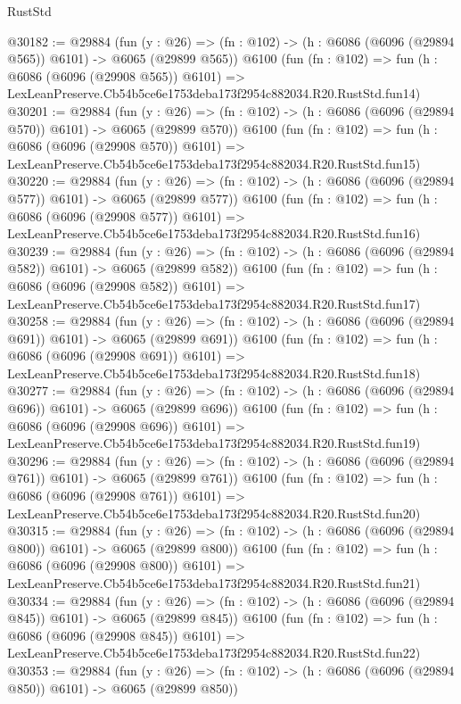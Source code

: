 \begin{lexlean}{RustStd}
\begin{coremodule}
@30182 := @29884
    (fun (y : @26) => (fn : @102) -> (h : @6086 (@6096 (@29894 @565)) @6101) -> @6065 (@29899 @565))
    @6100
    (fun (fn : @102) =>
    fun (h : @6086 (@6096 (@29908 @565)) @6101) =>
    LexLeanPreserve.Cb54b5ce6e1753deba173f2954c882034.R20.RustStd.fun14)
@30201 := @29884
    (fun (y : @26) => (fn : @102) -> (h : @6086 (@6096 (@29894 @570)) @6101) -> @6065 (@29899 @570))
    @6100
    (fun (fn : @102) =>
    fun (h : @6086 (@6096 (@29908 @570)) @6101) =>
    LexLeanPreserve.Cb54b5ce6e1753deba173f2954c882034.R20.RustStd.fun15)
@30220 := @29884
    (fun (y : @26) => (fn : @102) -> (h : @6086 (@6096 (@29894 @577)) @6101) -> @6065 (@29899 @577))
    @6100
    (fun (fn : @102) =>
    fun (h : @6086 (@6096 (@29908 @577)) @6101) =>
    LexLeanPreserve.Cb54b5ce6e1753deba173f2954c882034.R20.RustStd.fun16)
@30239 := @29884
    (fun (y : @26) => (fn : @102) -> (h : @6086 (@6096 (@29894 @582)) @6101) -> @6065 (@29899 @582))
    @6100
    (fun (fn : @102) =>
    fun (h : @6086 (@6096 (@29908 @582)) @6101) =>
    LexLeanPreserve.Cb54b5ce6e1753deba173f2954c882034.R20.RustStd.fun17)
@30258 := @29884
    (fun (y : @26) => (fn : @102) -> (h : @6086 (@6096 (@29894 @691)) @6101) -> @6065 (@29899 @691))
    @6100
    (fun (fn : @102) =>
    fun (h : @6086 (@6096 (@29908 @691)) @6101) =>
    LexLeanPreserve.Cb54b5ce6e1753deba173f2954c882034.R20.RustStd.fun18)
@30277 := @29884
    (fun (y : @26) => (fn : @102) -> (h : @6086 (@6096 (@29894 @696)) @6101) -> @6065 (@29899 @696))
    @6100
    (fun (fn : @102) =>
    fun (h : @6086 (@6096 (@29908 @696)) @6101) =>
    LexLeanPreserve.Cb54b5ce6e1753deba173f2954c882034.R20.RustStd.fun19)
@30296 := @29884
    (fun (y : @26) => (fn : @102) -> (h : @6086 (@6096 (@29894 @761)) @6101) -> @6065 (@29899 @761))
    @6100
    (fun (fn : @102) =>
    fun (h : @6086 (@6096 (@29908 @761)) @6101) =>
    LexLeanPreserve.Cb54b5ce6e1753deba173f2954c882034.R20.RustStd.fun20)
@30315 := @29884
    (fun (y : @26) => (fn : @102) -> (h : @6086 (@6096 (@29894 @800)) @6101) -> @6065 (@29899 @800))
    @6100
    (fun (fn : @102) =>
    fun (h : @6086 (@6096 (@29908 @800)) @6101) =>
    LexLeanPreserve.Cb54b5ce6e1753deba173f2954c882034.R20.RustStd.fun21)
@30334 := @29884
    (fun (y : @26) => (fn : @102) -> (h : @6086 (@6096 (@29894 @845)) @6101) -> @6065 (@29899 @845))
    @6100
    (fun (fn : @102) =>
    fun (h : @6086 (@6096 (@29908 @845)) @6101) =>
    LexLeanPreserve.Cb54b5ce6e1753deba173f2954c882034.R20.RustStd.fun22)
@30353 := @29884
    (fun (y : @26) => (fn : @102) -> (h : @6086 (@6096 (@29894 @850)) @6101) -> @6065 (@29899 @850))

\end{coremodule}
\end{lexlean}
